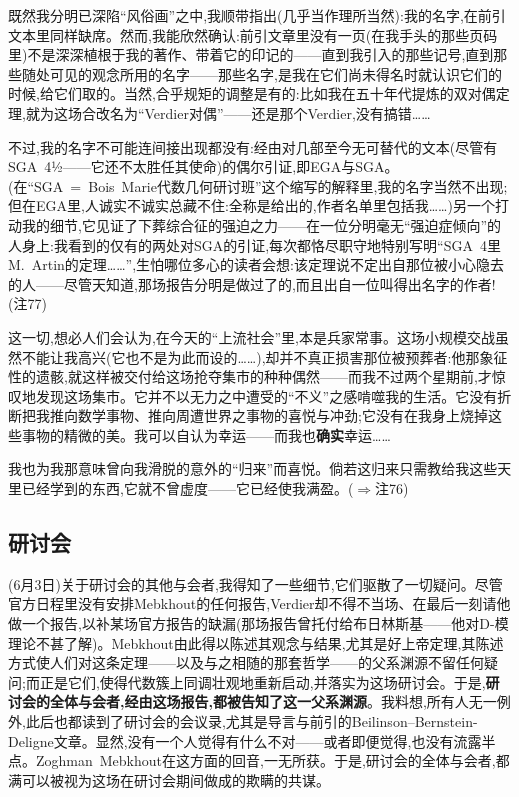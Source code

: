 既然我分明已深陷“风俗画”之中,我顺带指出(几乎当作理所当然):我的名字,在前引文本里同样缺席。然而,我能欣然确认:前引文章里没有一页(在我手头的那些页码里)不是深深植根于我的著作、带着它的印记的——直到我引入的那些记号,直到那些随处可见的观念所用的名字——那些名字,是我在它们尚未得名时就认识它们的时候,给它们取的。当然,合乎规矩的调整是有的:比如我在五十年代提炼的双对偶定理,就为这场合改名为“Verdier对偶”——还是那个Verdier,没有搞错……

不过,我的名字不可能连间接出现都没有:经由对几部至今无可替代的文本(尽管有SGA~4½——它还不太胜任其使命)的偶尔引证,即EGA与SGA。(在“SGA~=~Bois~Marie代数几何研讨班”这个缩写的解释里,我的名字当然不出现;但在EGA里,人诚实不诚实总藏不住:全称是给出的,作者名单里包括我……)另一个打动我的细节,它见证了下葬综合征的强迫之力——在一位分明毫无“强迫症倾向”的人身上:我看到的仅有的两处对SGA的引证,每次都恪尽职守地特别写明“SGA~4里M.~Artin的定理……”,生怕哪位多心的读者会想:该定理说不定出自那位被小心隐去的人——尽管天知道,那场报告分明是做过了的,而且出自一位叫得出名字的作者!(注77)

\dmark{}这一切,想必人们会认为,在今天的“上流社会”里,本是兵家常事。这场小规模交战虽然不能让我高兴(它也不是为此而设的……),却并不真正损害那位被预葬者:他那象征性的遗骸,就这样被交付给这场抢夺集市的种种偶然——而我不过两个星期前,才惊叹地发现这场集市。它并不以无力之中遭受的“不义”之感啃噬我的生活。它没有折断把我推向数学事物、推向周遭世界之事物的喜悦与冲劲;它没有在我身上烧掉这些事物的精微的美。我可以自认为幸运——而我也\textbf{确实}幸运……

我也为我那意味曾向我滑脱的意外的“归来”而喜悦。倘若这归来只需教给我这些天里已经学到的东西,它就不曾虚度——它已经使我满盈。($\Rightarrow$注76)

\subsection{研讨会}


(6月3日)关于研讨会的其他与会者,我得知了一些细节,它们驱散了一切疑问。尽管官方日程里没有安排Mebkhout的任何报告,Verdier却不得不当场、在最后一刻请他做一个报告,以补某场官方报告的缺漏(那场报告曾托付给布日林斯基——他对D-模理论不甚了解)。Mebkhout由此得以陈述其观念与结果,尤其是好上帝定理,其陈述方式使人们对这条定理——以及与之相随的那套哲学——的父系渊源不留任何疑问;而正是它们,使得代数簇上同调壮观地重新启动,并落实为这场研讨会。于是,\textbf{研讨会的全体与会者,经由这场报告,都被告知了这一父系渊源}。我料想,所有人无一例外,此后也都读到了研讨会的会议录,尤其是导言与前引的Beilinson--Bernstein-Deligne文章。显然,没有一个人觉得有什么不对——或者即便觉得,也没有流露半点。Zoghman~Mebkhout在这方面的回音,一无所获。于是,研讨会的全体与会者,都满可以被视为这场在研讨会期间做成的欺瞒的共谋。

